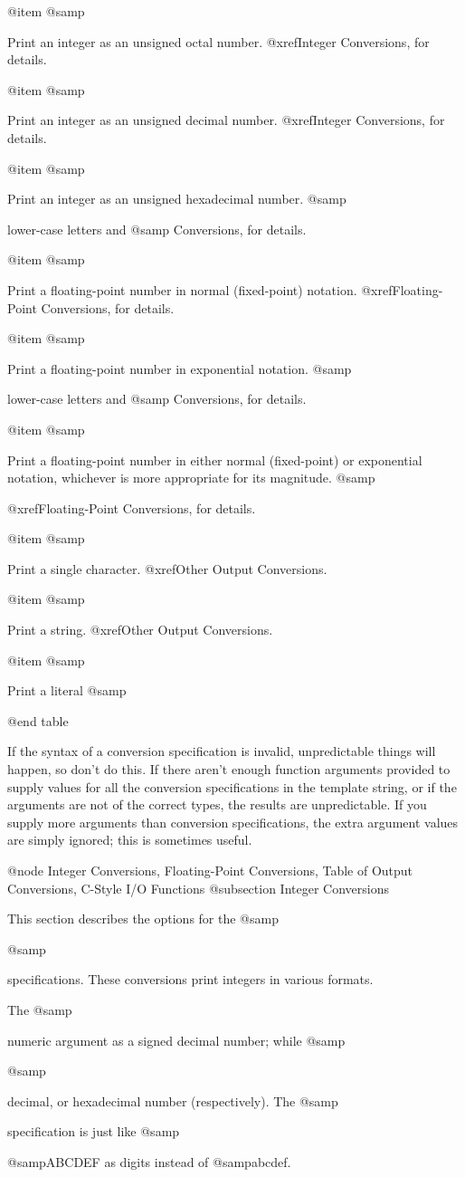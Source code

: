 {{{{{{{{{{{{{{{{@item @samp{%
Print an integer as an unsigned octal number.  @xref{Integer
Conversions}, for details.

@item @samp{%
Print an integer as an unsigned decimal number.  @xref{Integer
Conversions}, for details.

@item @samp{%
Print an integer as an unsigned hexadecimal number.  @samp{%
lower-case letters and @samp{%
Conversions}, for details.

@item @samp{%
Print a floating-point number in normal (fixed-point) notation.
@xref{Floating-Point Conversions}, for details.

@item @samp{%
Print a floating-point number in exponential notation.  @samp{%
lower-case letters and @samp{%
Conversions}, for details.

@item @samp{%
Print a floating-point number in either normal (fixed-point) or
exponential notation, whichever is more appropriate for its magnitude.
@samp{%
@xref{Floating-Point Conversions}, for details.

@item @samp{%
Print a single character.  @xref{Other Output Conversions}.

@item @samp{%
Print a string.  @xref{Other Output Conversions}.

@item @samp{%
Print a literal @samp{%
@end table

If the syntax of a conversion specification is invalid, unpredictable
things will happen, so don't do this.  If there aren't enough function
arguments provided to supply values for all the conversion
specifications in the template string, or if the arguments are not of
the correct types, the results are unpredictable.  If you supply more
arguments than conversion specifications, the extra argument values are
simply ignored; this is sometimes useful.

@node Integer Conversions, Floating-Point Conversions, Table of Output Conversions, C-Style I/O Functions
@subsection Integer Conversions

This section describes the options for the @samp{%
@samp{%
specifications.  These conversions print integers in various formats.

The @samp{%
numeric argument as a signed decimal number; while @samp{%
@samp{%
decimal, or hexadecimal number (respectively).  The @samp{%
specification is just like @samp{%
@samp{ABCDEF} as digits instead of @samp{abcdef}.

}}}}}}}}}}}}}}}}}}}}}}}}}}}}}}}}}}}}
